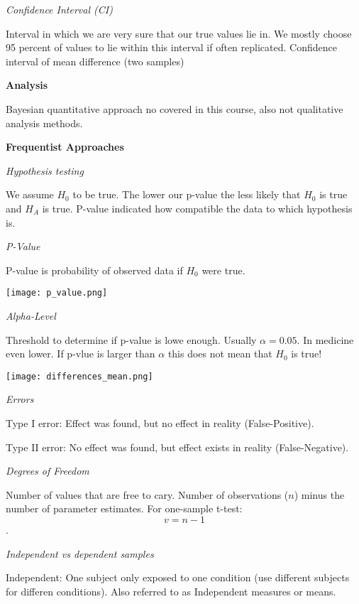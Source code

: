 \textit{Confidence Interval (CI)} \smallskip

Interval in which we are very sure that our true values lie in. We mostly choose 95 percent of values to lie within this interval if often replicated. 
Confidence interval of mean difference (two samples) \medskip

 \textbf{Analysis} \smallskip

 Bayesian quantitative approach no covered in this course, also not qualitative analysis methods. \medskip

\textbf{Frequentist Approaches} \smallskip

\textit{Hypothesis testing} \smallskip

We assume $H_0$ to be true. The lower our p-value the less likely that $H_0$ is true and $H_A$ is true. P-value indicated how compatible the data to which hypothesis is. \medskip

\textit{P-Value} \smallskip

P-value is probability of observed data if $H_0$ were true.

\begin{center}
	\texttt{[image: p\_value.png]}
\end{center}


\textit{Alpha-Level} \smallskip

Threshold to determine if p-value is lowe enough. Usually $\alpha = 0.05$. In medicine even lower.
If p-vlue is larger than $\alpha$ this does not mean that $H_0$ is true! \medskip


\begin{center}
	\texttt{[image: differences\_mean.png]}
\end{center}



\textit{Errors} \smallskip

Type I error: Effect was found, but no effect in reality (False-Positive).

Type II error: No effect was found, but effect exists in reality (False-Negative). \medskip

\textit{Degrees of Freedom} \smallskip

Number of values that are free to cary. Number of observations ($n$) minus the number of parameter estimates. For one-sample t-test: $$v = n-1$$. \medskip

\textit{Independent vs dependent samples} \smallskip

Independent: One subject only exposed to one condition (use different subjects for differen conditions). Also referred to as Independent measures or means. 

